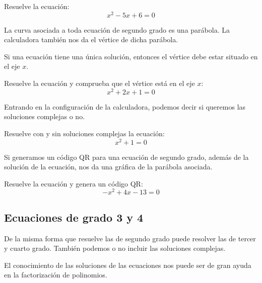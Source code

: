\documentclass[12pt]{article}
\newenvironment{capitulo}{\begin{tcolorbox}[colback=blue!5!white,colframe=red!75!black]}{\end{tcolorbox}\bigskip}
\newenvironment{ejer}{\begin{tcolorbox}[center title, 
fonttitle=\sffamily\bfseries,colback=blue!5,colframe=orange]}{\end{tcolorbox}}
\begin{document}
\begin{ejer}

Resuelve la ecuación:
\[
x^2-5x+6=0
\]

\end{ejer}

La curva asociada a toda ecuación de segundo grado es una parábola. La calculadora también nos da el vértice de dicha parábola.

Si una ecuación tiene una única solución, entonces el vértice debe estar situado en el eje $x$.

\begin{ejer}

Resuelve la ecuación y comprueba que el vértice está en el eje $x$:
\[
x^2+2x+1=0
\]

\end{ejer}


Entrando en la configuración de la calculadora, podemos decir si queremos las soluciones complejas o no.

\begin{ejer}

Resuelve con y sin soluciones complejas la ecuación:
\[
x^2+1=0
\]

\end{ejer}

Si generamos un código QR para una ecuación de segundo grado, además de la solución de la ecuación, nos da una gráfica de la parábola asociada.

\begin{ejer} 

Resuelve la ecuación y genera un código QR:
\[
-x^2+4x-13=0
\]

\end{ejer}

\newpage

\newpage

\begin{capitulo}
\section*{Ecuaciones de grado 3 y 4}
\end{capitulo}

De la misma forma que resuelve las de segundo grado puede resolver las de tercer y cuarto grado. También podemos o no incluir las soluciones complejas.

El conocimiento de las soluciones de las ecuaciones nos puede ser de gran ayuda en la factorización de polinomios.
\end{document}
